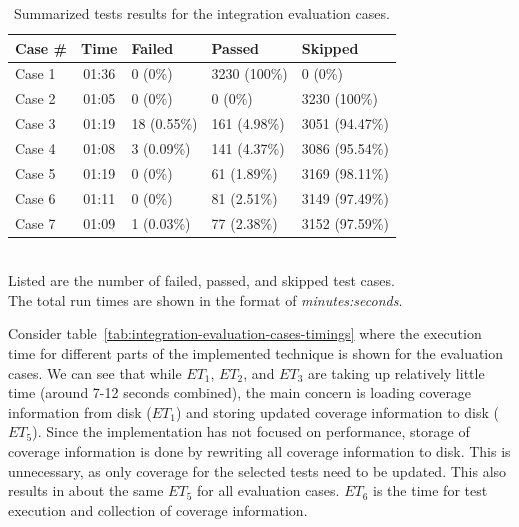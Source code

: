 \documentclass[a4paper,english,12pt]{report}
\begin{document}
\begin{table}[htbp]
  \centering
  \begin{tabular}{|l|c|l|l|l|}
    \hline
    \textbf{Case \#} & \textbf{Time} & \textbf{Failed} & \textbf{Passed} & \textbf{Skipped}\\
    \hline
    Case 1 & 01:36 & 0 (0\%) & 3230 (100\%) & 0 (0\%)\\
    \hline
    Case 2 & 01:05 & 0 (0\%) & 0 (0\%) & 3230 (100\%)\\
    \hline
    Case 3 & 01:19 & 18 (0.55\%) & 161 (4.98\%) & 3051 (94.47\%)\\
    \hline
    Case 4 & 01:08 & 3 (0.09\%) & 141 (4.37\%) & 3086 (95.54\%)\\
    \hline
    Case 5 & 01:19 & 0 (0\%) & 61 (1.89\%) & 3169 (98.11\%)\\
    \hline
    Case 6 & 01:11 & 0 (0\%) & 81 (2.51\%) & 3149 (97.49\%)\\
    \hline
    Case 7 & 01:09 & 1 (0.03\%) & 77 (2.38\%) & 3152 (97.59\%)\\
    \hline
  \end{tabular}
    {\\[2ex]\footnotesize Listed are the number of failed, passed, and skipped test cases.\\ The total run times are shown in the format of \textit{minutes:seconds}.}
  \caption{Summarized tests results for the integration evaluation cases.}
  \label{tab:integration-evaluation-cases-results}
\end{table}

Consider table~\vref{tab:integration-evaluation-cases-timings} where the execution time for different parts of the implemented technique is shown for the evaluation cases. We can see that while $\mathit{ET}_1$, $\mathit{ET}_2$, and $\mathit{ET}_3$ are taking up relatively little time (around 7-12 seconds combined), the main concern is loading coverage information from disk ($\mathit{ET}_1$) and storing updated coverage information to disk ($\mathit{ET}_5$). Since the implementation has not focused on performance, storage of coverage information is done by rewriting all coverage information to disk. This is unnecessary, as only coverage for the selected tests need to be updated. This also results in about the same $\mathit{ET}_5$ for all evaluation cases. $\mathit{ET}_6$ is the time for test execution and collection of coverage information.
\end{document}

